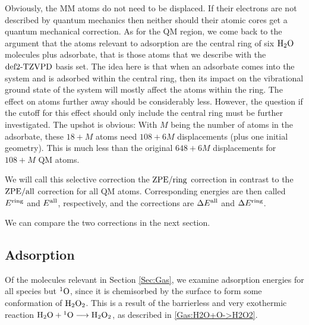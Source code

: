 \documentclass[8.5pt,twoside,twocolumn]{article}
\newcommand\zpe{\enmat{\te{ZPE}}}
\newcommand\ering{\enmat{E^{\te{ring}}}}
\newcommand\eall{\enmat{E^{\te{all}}}}
\newcommand\zpering{\enmat{\zpe/\te{ring}}}
\newcommand\zpeall{\enmat{\zpe/\te{all}}}
\newcommand\singo{\enmat{{^1\te{O}}}}
\theoremstyle{standard}
\begin{document}
Obviously, the MM atoms do not need to be displaced. If their electrons are not
described by quantum mechanics then neither should their atomic cores get a
quantum mechanical correction. As for the QM region, we come back to the argument that
the atoms relevant to adsorption are the central ring of six $\text H _2 \text O$ molecules plus adsorbate,
that is those atoms that we describe with the $\text{def2-TZVPD}$ basis set. The idea
here is that when an adsorbate comes into the system and is adsorbed within the
central ring, then its impact on the vibrational ground state of the system
will mostly affect the atoms within the ring. The effect on atoms further
away should be considerably less. However, the question if the cutoff for this effect
should only include the central ring must be further investigated. The
upshot is obvious: With $M$ being the number of atoms in the adsorbate, these $18+M$ atoms
need $108+6M$ displacements (plus one initial geometry). This is much less than
the original $648+6M$ displacements for $108+M$ QM atoms.

We will call this selective correction the $\zpering$ correction in contrast to
the $\zpeall$ correction for all QM atoms. Corresponding energies are then called
$\ering$ and $\eall$, respectively, and the corrections are $\Dl\eall$ and $\Dl\ering$. 

We can compare the two corrections in the next section.



\subsection{Adsorption}
\label{Sec:Ads:Adsorption}
\newcommand\avg{\enmat{E_{\te {avg}}^{\te{ads}}}}
Of the molecules relevant in Section \ref{Sec:Gas}, we examine adsorption
energies for all species but $\singo$, since it is chemisorbed by the surface
to form some conformation of $\text H _2 \text O_2$. This is a result of the barrierless
and very exothermic reaction \mbox{$\hto+\singo\chemar\htot$}, as described in
\eqref{Gas:H2O+O->H2O2}.
\end{document}
